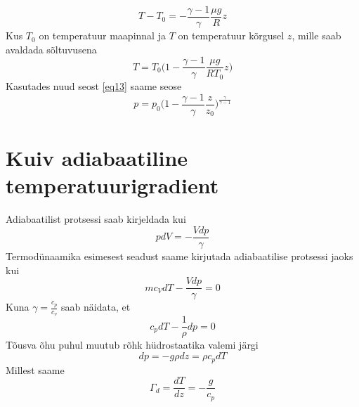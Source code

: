 \documentclass{trkut}%
\begin{document}
\begin{equation*}
T - T_0 = - \frac{\gamma - 1}{\gamma} \frac{\mu g}{R} z
\end{equation*}
Kus $T_0$ on temperatuur maapinnal ja $T$ on temperatuur kõrgusel $z$, mille saab avaldada sõltuvusena
\begin{equation*}
T=T_0 \bigg( 1-\frac{\gamma-1}{\gamma} \frac{\mu g}{R T_0} z \bigg)
\end{equation*}
Kasutades nuud seost \ref{eq13} saame seose
\begin{equation*}
p = p_0 \bigg( 1-\frac{\gamma-1}{\gamma} \frac{z}{z_0} \bigg)^\frac{\gamma}{\gamma-1}
\end{equation*}



\section{Kuiv adiabaatiline temperatuurigradient}
Adiabaatilist protsessi saab kirjeldada kui
\begin{equation*}
pdV = -\frac{Vdp}{\gamma}
\end{equation*}
Termodünaamika esimesest seadust saame kirjutada adiabaatilise protsessi jaoks kui 
\begin{equation*}
mc_V dT - \frac{Vdp}{\gamma} = 0
\end{equation*}
Kuna $\gamma = \frac{c_p}{c_v}$ saab näidata, et
\begin{equation*}
c_p dT - \frac{1}{\rho}dp = 0
\end{equation*}
Tõusva õhu puhul muutub rõhk hüdrostaatika valemi järgi
\begin{equation*}
dp = - g\rho dz = \rho c_p dT
\end{equation*}
Millest saame
\begin{equation*}
\Gamma_d = \frac{dT}{dz} = -\frac{g}{c_p}
\end{equation*}
\end{document}
